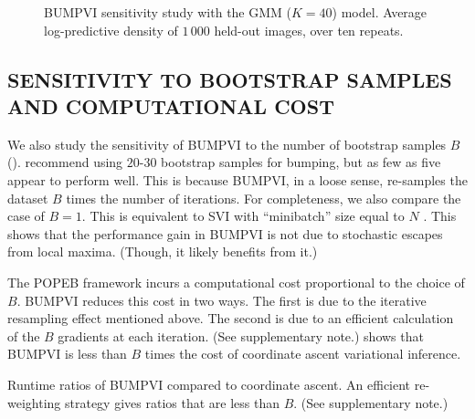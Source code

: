 \begin{figure}[tb]
\centering

\vspace*{-12pt}
\caption{\gls{BUMPVI} sensitivity study with the \gls{GMM} ($K=40$) model.
Average log-predictive density of $1\,000$ held-out images, over ten repeats.}
\label{fig:sensitivity}
\end{figure}

\subsection{SENSITIVITY TO BOOTSTRAP SAMPLES AND COMPUTATIONAL COST}

We also study the sensitivity of \gls{BUMPVI} to the number of bootstrap
samples $B$ ().
\cite{tibshirani1999model} recommend using $20$-$30$ bootstrap
samples for bumping, but as few as five appear to perform well. This is
because \gls{BUMPVI}, in a loose sense, re-samples the dataset
$B$ times the number of iterations. For completeness, we also compare the case
of $B=1$. This is equivalent to \gls{SVI} with ``minibatch'' size equal to $N$
\citep{hoffman2013stochastic}. This shows that the performance gain in
\gls{BUMPVI} is not due to stochastic escapes from local maxima. (Though,
it likely benefits from it.)

The \gls{POPEB} framework incurs a computational cost proportional to
the choice of $B$. \gls{BUMPVI} reduces this cost in two ways. The first
is due to the iterative resampling effect mentioned above. The second is due to
an efficient calculation of the $B$ gradients at each iteration.
(See supplementary note.)  shows that \gls{BUMPVI} is
less than $B$ times the cost of coordinate ascent variational inference.

\begin{table}[tb]
\caption{Runtime ratios of \gls{BUMPVI} compared to coordinate ascent. An
efficient re-weighting strategy gives ratios that are less than $B$. (See
supplementary note.) }
\label{tab:timing_results}
\begin{center}
{

}
\end{center}
\end{table}
